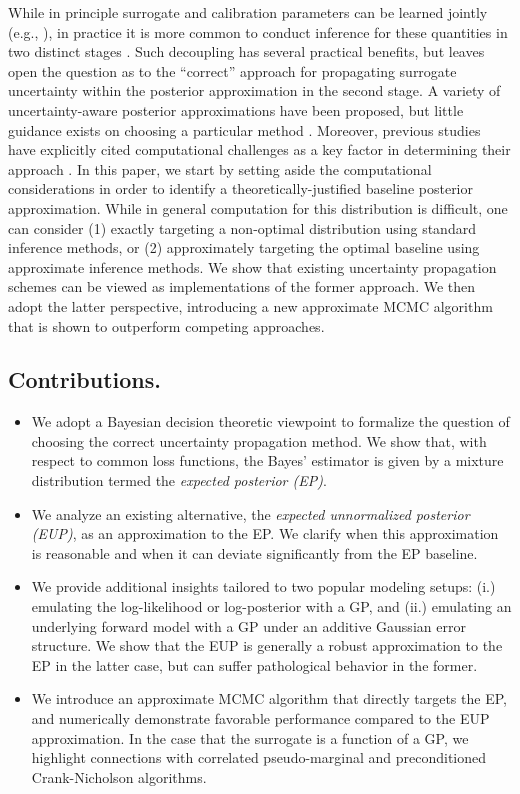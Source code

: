 \documentclass[12pt]{article}
\begin{document}
While in principle surrogate and calibration parameters can be learned 
jointly (e.g., \citet{KOH}), in practice it is more common to conduct inference 
for these quantities in two distinct stages \citep{modularization,PlummerCut}.
Such decoupling has several practical benefits, but leaves open the 
question as to the ``correct'' approach for propagating surrogate uncertainty 
within the posterior approximation in the second stage.
A variety of uncertainty-aware posterior 
approximations have been proposed, but little guidance exists on choosing a particular 
method \citep{reviewPaper,BilionisBayesSurrogates,StuartTeck1,VehtariParallelGP,
BurknerSurrogate,BurknerTwoStep,FerEmulation}. Moreover, previous studies have 
explicitly cited computational challenges as a key factor in determining their 
approach \citep{VehtariParallelGP,StuartTeck2}. In this paper, we start by setting 
aside the computational considerations in order to identify a theoretically-justified 
baseline posterior approximation. While in general computation for this distribution 
is difficult, one can consider (1) exactly targeting a non-optimal distribution using standard
inference methods, or (2) approximately targeting the optimal baseline using
approximate inference methods.
We show that existing uncertainty propagation schemes can be viewed as 
implementations of the former approach. We then adopt the latter perspective,
introducing a new approximate MCMC algorithm that is shown to outperform 
competing approaches.
 
\subsection{Contributions.}
\begin{itemize}
\item We adopt a Bayesian decision theoretic viewpoint to formalize the question of 
choosing the correct uncertainty propagation method. We show that, with respect 
to common loss functions, the Bayes' estimator is given by a mixture distribution 
termed the \textit{expected posterior (EP)}.
\item We analyze an existing alternative, the \textit{expected unnormalized posterior (EUP)},
as an approximation to the EP. We clarify when this approximation is reasonable and 
when it can deviate significantly from the EP baseline.
\item We provide additional insights tailored to two popular modeling setups: 
(i.) emulating the log-likelihood or log-posterior with a GP, and (ii.) emulating an 
underlying forward model with a GP under an additive Gaussian error structure. 
We show that the EUP is generally a robust approximation to the EP in 
the latter case, but can suffer pathological behavior in the former.
\item We introduce an approximate MCMC algorithm that directly 
targets the EP, and numerically demonstrate favorable performance compared 
to the EUP approximation. In the case that the surrogate is a function of a 
GP, we highlight connections with correlated pseudo-marginal and 
preconditioned Crank-Nicholson algorithms. 
\end{itemize}
\end{document}
